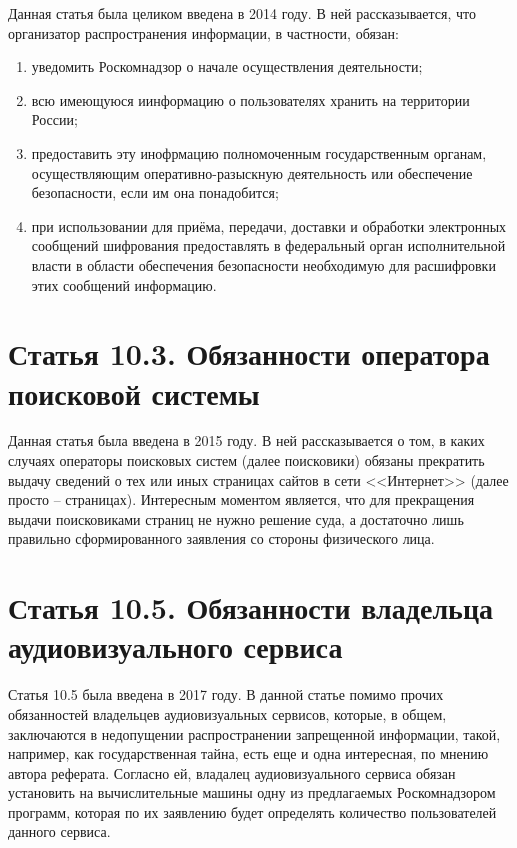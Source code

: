 Данная статья была целиком введена в 2014 году. В ней рассказывается, что организатор распространения информации, в частности, обязан:

\begin{enumerate}
	\item уведомить Роскомнадзор о начале осуществления деятельности;
	\item всю имеющуюся иинформацию о пользователях хранить на территории России;
	\item предоставить эту инофрмацию полномоченным государственным органам, осуществляющим оперативно-разыскную деятельность или обеспечение безопасности, если им она понадобится;
	\item при использовании для приёма, передачи, доставки и обработки электронных сообщений шифрования предоставлять в федеральный орган исполнительной власти в области обеспечения безопасности необходимую для расшифровки этих сообщений информацию.
\end{enumerate}

\section{Статья 10.3. Обязанности оператора поисковой системы}

Данная статья была введена в 2015 году. В ней рассказывается о том, в каких случаях операторы поисковых систем (далее поисковики) обязаны прекратить выдачу сведений о тех или иных страницах сайтов в сети <<Интернет>> (далее просто -- страницах). Интересным моментом является, что для прекращения выдачи поисковиками страниц не нужно решение суда, а достаточно лишь правильно сформированного заявления со стороны физического лица.

\section{Статья 10.5. Обязанности владельца аудиовизуального сервиса}

Статья 10.5 была введена в 2017 году. В данной статье помимо прочих обязанностей владельцев аудиовизуальных сервисов, которые, в общем, заключаются в недопущении распространении запрещенной информации, такой, например, как государственная тайна, есть еще и одна интересная, по мнению автора реферата. Согласно ей, владалец аудиовизуального сервиса обязан установить на вычислительные машины одну из предлагаемых Роскомнадзором программ, которая по их заявлению будет определять количество пользователей данного сервиса. 

